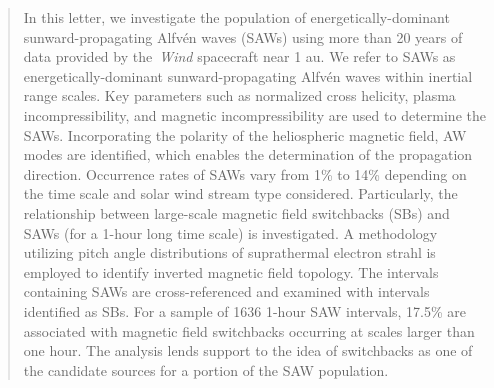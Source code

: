 \documentclass[twocolumn, times]{aastex631}
\begin{document}

\author[0009-0001-4304-0809]{Nickolas Giardetti}

\author[0000-0002-2358-6628]{Sofiane Bourouaine}

\author[0000-0002-8841-6443]{Jean C. Perez}



\begin{abstract}
In this letter, we investigate the population of energetically-dominant sunward-propagating Alfv\'en waves (SAWs) using more than 20 years of data provided by the~\emph{Wind} spacecraft near 1 au. We refer to SAWs as energetically-dominant sunward-propagating Alfv\'en waves within inertial range scales. Key parameters such as normalized cross helicity, plasma incompressibility, and magnetic incompressibility are used to determine the SAWs. Incorporating the polarity of the heliospheric magnetic field, AW modes are identified, which enables the determination of the propagation direction. Occurrence rates of SAWs vary from 1\% to 14\% depending on the time scale and solar wind stream type considered. Particularly, the relationship between large-scale magnetic field switchbacks (SBs) and SAWs (for a 1-hour long time scale) is investigated. A methodology utilizing pitch angle distributions of suprathermal electron strahl is employed to identify inverted magnetic field topology. The intervals containing SAWs are cross-referenced and examined with intervals identified as SBs. For a sample of 1636 1-hour SAW intervals, 17.5\% are associated with magnetic field switchbacks occurring at scales larger than one hour. The analysis lends support to the idea of switchbacks as one of the candidate sources for a portion of the SAW population.
\end{abstract}
\end{document}
